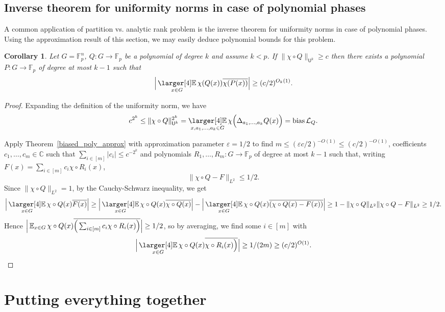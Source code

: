 \documentclass[a4paper,11pt]{article}
\newtheorem{corollary}[theorem]{Corollary}
\theoremstyle{definition}
\newcommand{\on}[1]{
	\operatorname{#1}
}
\newcommand{\exx}{
  \mathop{
    \mathchoice{\vcenter{\hbox{\larger[4]$\mathbb{E}$}}}
               {\kern0pt\mathbb{E}}
               {\kern0pt\mathbb{E}}
               {\kern0pt\mathbb{E}}
  }\displaylimits
}
\begin{document}
\subsection{Inverse theorem for uniformity norms in case of polynomial phases}

A common application of partition vs. analytic rank problem is the inverse theorem for uniformity norms in case of polynomial phases. Using the approximation result of this section, we may easily deduce polynomial bounds for this problem.

\begin{corollary}
    Let $G = \mathbb{F}_p^n$, $Q : G\to \mathbb{F}_p$ be a polynomial of degree $k$ and assume $k < p$. If $\|\chi \circ Q\|_{\mathsf{U}^k} \geq c$ then there exists a polynomial $P : G \to \mathbb{F}_p$ of degree at most $k-1$ such that
    \[\Big|\exx_{x \in G} \chi(Q(x))\overline{\chi(P(x))}\Big| \geq (c/2)^{O_k(1)}.\]
\end{corollary}

\begin{proof}
     Expanding the definition of the uniformity norm, we have
    \[c^{2^k} \leq \|\chi \circ Q\|_{\mathsf{U}^k}^{2^k} = \exx_{x, a_1, \dots, a_k \in G} \chi\Big(\Delta_{a_1, \dots, a_k} Q(x)\Big) = \on{bias} \mathcal{L}_Q.\]

    Apply Theorem~\ref{biased_poly_approx} with approximation parameter $\varepsilon = 1/2$ to find $m \leq (\varepsilon c/2)^{-O(1)} \leq (c/2)^{-O(1)}$, coefficients $c_1, \dots, c_m \in \mathbb{C}$ such that $\sum_{i \in [m]} |c_i| \leq c^{-2^{k}}$ and polynomials $R_1, \dots, R_m : G \to \mathbb{F}_p$ of degree at most $k-1$ such that, writing $F(x) = \sum_{i \in [m]} c_i \chi \circ R_i(x)$,
    \[\Big\| \chi \circ Q - F\Big\|_{L^2} \leq 1/2.\]
    Since $\|\chi \circ Q\|_{L^2} = 1$, by the Cauchy-Schwarz inequality, we get
    \[\Big|\exx_{x \in G} \chi \circ Q(x) \overline{F(x)}\Big| \geq \Big|\exx_{x \in G} \chi \circ Q(x) \overline{\chi \circ Q(x)}\Big|  - \Big|\exx_{x \in G} \chi \circ Q(x) \overline{(\chi \circ Q(x) - F(x))}\Big| \geq 1 - \|\chi \circ Q\|_{L^2}\|\chi \circ Q - F\|_{L^2} \geq 1/2.\]
    Hence $\Big|\exx_{x \in G} \chi \circ Q(x) \overline{\Big(\sum_{i \in [m]} c_i \chi \circ R_i(x)\Big)}\Big| \geq 1/2$, so by averaging, we find some $i \in [m]$ with
    \[\Big|\exx_{x \in G} \chi \circ Q(x) \overline{\chi \circ R_i(x)\Big)}\Big| \geq 1/(2m) \geq (c/2)^{O(1)}.\qedhere\]
\end{proof}

\section{Putting everything together}
\end{document}
